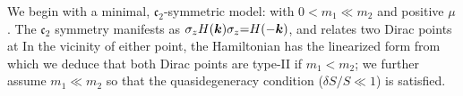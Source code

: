 \documentclass[aps, prb, showpacs, twocolumn, notitlepage, superscriptaddress]{revtex4-1}
\begin{document}


We begin with a minimal, $\mathfrak{c}_2$-symmetric model:
with $0{<}m_1{\ll}m_2$ and positive $\mu$.  The $\mathfrak{c}_2$ symmetry manifests as $\sigma_z H(\boldsymbol{k})\sigma_z{=}H({-}\boldsymbol{k})$, and relates 
two Dirac points at
In the vicinity of either point, the  Hamiltonian has the linearized form 
from which we deduce that both Dirac points are  type-II if $m_1{<}m_2$; we further assume $m_1{\ll}m_2$ so that the quasidegeneracy condition ($\delta S/S{\ll}1$) is satisfied. 



\end{document}
